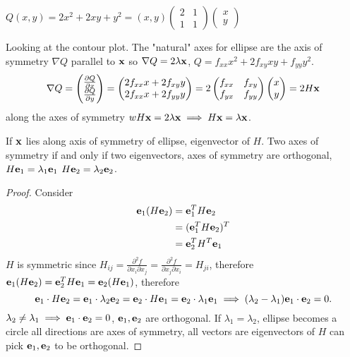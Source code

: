 \documentclass[10pt, a4paper]{article}
\begin{document}
\begin{example}
    $Q(x, y) = 2x ^ 2 + 2xy + y ^ 2 = (x, y)\begin{pmatrix}
        2 & 1 \\ 1 & 1
    \end{pmatrix}\begin{pmatrix}
        x \\ y
    \end{pmatrix}$

    Looking at the contour plot.
    The "natural" axes for ellipse are the axis of symmetry $\nabla Q$ parallel to $\mbf{x}$ so $\nabla Q = 2\lambda\mbf{x}$,
    $Q = f_{xx}x ^ 2 + 2f_{xy}xy + f_{yy}y ^ 2$.
    \[
    \nabla Q = \begin{pmatrix}
        \pd[Q]{x} \\
        \pd[Q]{y}
    \end{pmatrix} = \begin{pmatrix}
        2f_{xx}x + 2f_{xy}y \\
        2f_{xx}x + 2f_{yy}y
    \end{pmatrix} = 2\begin{pmatrix}
        f_{xx} & f_{xy} \\
        f_{yx} & f_{yy}
    \end{pmatrix}\begin{pmatrix}
        x \\ y
    \end{pmatrix} = 2H\mbf{x}
    \]
    along the axes of symmetry $wH\mbf{x} = 2\lambda\mbf{x} \implies H\mbf{x} = \lambda\mbf{x}$.
\end{example}

If $\mbf{x}$ lies along axis of symmetry of ellipse,
eigenvector of $H$.
Two axes of symmetry if and only if two eigenvectors,
axes of symmetry are orthogonal,
$H\mbf{e}_1 = \lambda_1\mbf{e}_1$
$H\mbf{e}_2 = \lambda_2\mbf{e}_2$.
\begin{proof}
    Consider
    \begin{align*}
        \mbf{e}_1(H\mbf{e}_2) &= \mbf{e}_1 ^ TH\mbf{e}_2 \\
        &= (\mbf{e}_1 ^ TH\mbf{e}_2) ^ T \\
        &= \mbf{e}_2 ^ TH ^ T\mbf{e}_1
    \end{align*}
    $H$ is symmetric since $H_{ij} = \frac{\partial ^ 2f}{\partial x_i\partial x_j} = \frac{\partial ^ 2f}{\partial x_j\partial x_i} = H_{ji}$,
    therefore $\mbf{e}_1(H\mbf{e}_2) = \mbf{e}_2 ^ TH\mbf{e}_1 = \mbf{e}_2(H\mbf{e}_1)$,
    therefore
    \[
    \mbf{e}_1 \cdot H\mbf{e}_2 = \mbf{e}_1 \cdot \lambda_2\mbf{e}_2 = \mbf{e}_2 \cdot H\mbf{e}_1 = \mbf{e}_2 \cdot \lambda_1\mbf{e}_1 \implies (\lambda_2 - \lambda_1)\mbf{e}_1 \cdot \mbf{e}_2 = 0.
    \]
    $\lambda_2 \neq \lambda_1 \implies \mbf{e}_1 \cdot \mbf{e}_2 = 0$,
    $\mbf{e}_1, \mbf{e}_2$ are orthogonal.
    If $\lambda_1 = \lambda_2$,
    ellipse becomes a circle all directions are axes of symmetry,
    all vectors are eigenvectors of $H$ can pick $\mbf{e}_1, \mbf{e}_2$ to be orthogonal.
\end{proof}
\end{document}
